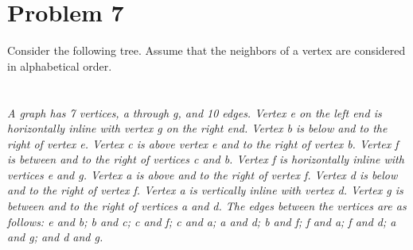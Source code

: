 \documentclass{amsart}
\theoremstyle{definition}
\theoremstyle{Exercise}
\theoremstyle{remark}
\theoremstyle{rule}
\numberwithin{equation}{section}
\begin{document}
 \newpage
\vspace*{0.25in}
\section*{Problem 7}
Consider the following tree. Assume that the neighbors of a vertex are considered in alphabetical order.
\\
\\\\
{\color{blue}{\bf Figure 15:} \emph{A graph has 7 vertices, a through g, and 10 edges. Vertex e on the left end is horizontally inline with vertex g on the right end. Vertex b is below and to the right of vertex e. Vertex c is above vertex e and to the right of vertex b. Vertex f is between and to the right of vertices c and b. Vertex f is horizontally inline with vertices e and g. Vertex a is above and to the right of vertex f. Vertex d is below and to the right of vertex f. Vertex a is vertically inline with vertex d. Vertex g is between and to the right of vertices a and d. The edges between the vertices are as follows: e and b; b and c; c and f; c and a; a and d; b and f; f and a; f and d; a and g; and d and g.
}
}
\\
\\
\end{document}
